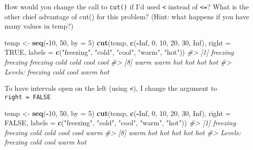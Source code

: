 \documentclass[]{book}
\newenvironment{Shaded}{\begin{snugshade}}{\end{snugshade}}
\newcommand{\CommentTok}[1]{\textcolor[rgb]{0.56,0.35,0.01}{\textit{#1}}}
\newcommand{\DataTypeTok}[1]{\textcolor[rgb]{0.13,0.29,0.53}{#1}}
\newcommand{\DecValTok}[1]{\textcolor[rgb]{0.00,0.00,0.81}{#1}}
\newcommand{\KeywordTok}[1]{\textcolor[rgb]{0.13,0.29,0.53}{\textbf{#1}}}
\newcommand{\NormalTok}[1]{#1}
\newcommand{\OperatorTok}[1]{\textcolor[rgb]{0.81,0.36,0.00}{\textbf{#1}}}
\newcommand{\OtherTok}[1]{\textcolor[rgb]{0.56,0.35,0.01}{#1}}
\newcommand{\StringTok}[1]{\textcolor[rgb]{0.31,0.60,0.02}{#1}}
\theoremstyle{definition}
\theoremstyle{definition}
\theoremstyle{definition}
\theoremstyle{remark}
\begin{document}
How would you change the call to \texttt{cut()} if I'd used
\texttt{\textless{}} instead of \texttt{\textless{}=}? What is the other
chief advantage of cut() for this problem? (Hint: what happens if you
have many values in temp?)

\begin{Shaded}
\begin{Highlighting}[]
\NormalTok{temp <-}\StringTok{ }\KeywordTok{seq}\NormalTok{(}\OperatorTok{-}\DecValTok{10}\NormalTok{, }\DecValTok{50}\NormalTok{, }\DataTypeTok{by =} \DecValTok{5}\NormalTok{)}
\KeywordTok{cut}\NormalTok{(temp, }\KeywordTok{c}\NormalTok{(}\OperatorTok{-}\OtherTok{Inf}\NormalTok{, }\DecValTok{0}\NormalTok{, }\DecValTok{10}\NormalTok{, }\DecValTok{20}\NormalTok{, }\DecValTok{30}\NormalTok{, }\OtherTok{Inf}\NormalTok{), }\DataTypeTok{right =} \OtherTok{TRUE}\NormalTok{,}
    \DataTypeTok{labels =} \KeywordTok{c}\NormalTok{(}\StringTok{"freezing"}\NormalTok{, }\StringTok{"cold"}\NormalTok{, }\StringTok{"cool"}\NormalTok{, }\StringTok{"warm"}\NormalTok{, }\StringTok{"hot"}\NormalTok{))}
\CommentTok{#>  [1] freezing freezing freezing cold     cold     cool     cool    }
\CommentTok{#>  [8] warm     warm     hot      hot      hot      hot     }
\CommentTok{#> Levels: freezing cold cool warm hot}
\end{Highlighting}
\end{Shaded}

To have intervals open on the left (using \texttt{\textless{}}), I
change the argument to \texttt{right\ =\ FALSE}

\begin{Shaded}
\begin{Highlighting}[]
\NormalTok{temp <-}\StringTok{ }\KeywordTok{seq}\NormalTok{(}\OperatorTok{-}\DecValTok{10}\NormalTok{, }\DecValTok{50}\NormalTok{, }\DataTypeTok{by =} \DecValTok{5}\NormalTok{)}
\KeywordTok{cut}\NormalTok{(temp, }\KeywordTok{c}\NormalTok{(}\OperatorTok{-}\OtherTok{Inf}\NormalTok{, }\DecValTok{0}\NormalTok{, }\DecValTok{10}\NormalTok{, }\DecValTok{20}\NormalTok{, }\DecValTok{30}\NormalTok{, }\OtherTok{Inf}\NormalTok{), }\DataTypeTok{right =} \OtherTok{FALSE}\NormalTok{,}
    \DataTypeTok{labels =} \KeywordTok{c}\NormalTok{(}\StringTok{"freezing"}\NormalTok{, }\StringTok{"cold"}\NormalTok{, }\StringTok{"cool"}\NormalTok{, }\StringTok{"warm"}\NormalTok{, }\StringTok{"hot"}\NormalTok{))}
\CommentTok{#>  [1] freezing freezing cold     cold     cool     cool     warm    }
\CommentTok{#>  [8] warm     hot      hot      hot      hot      hot     }
\CommentTok{#> Levels: freezing cold cool warm hot}
\end{Highlighting}
\end{Shaded}
\end{document}
